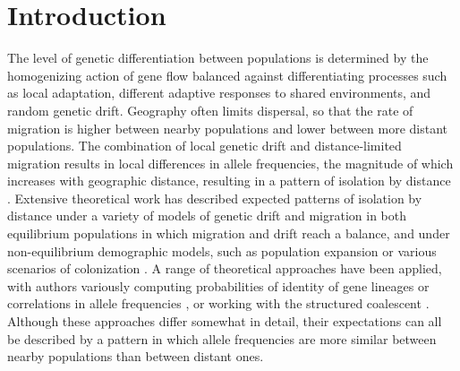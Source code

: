 \newpage


\section*{Introduction}

The level of genetic differentiation between populations is determined by the homogenizing action of gene flow balanced against differentiating processes such as local adaptation, different adaptive responses to shared environments, and random genetic drift.  Geography often limits dispersal, so that the rate of migration is higher between nearby populations and lower between more distant populations.  The combination of local genetic drift and distance-limited migration results in local differences in allele frequencies, the magnitude of which increases with geographic distance, resulting in a pattern of isolation by distance \citep{Wright1943}. Extensive theoretical work has described expected patterns of isolation by distance under a variety of models of genetic drift and migration \citep{Charlesworth2003} in both equilibrium populations in which migration and drift reach a balance, and under non-equilibrium demographic models, such as population expansion or various scenarios of colonization \citep{Slatkin1993}.  A range of theoretical approaches have been applied, with authors variously computing probabilities of identity of gene lineages \citep[e.g.][]{Malecot1975, Rousset1997} or correlations in allele frequencies \citep[e.g.][]{SlatkinMaruyama1975, WeirCockerham1984}, or working with the structured coalescent \citep[e.g.][]{Hey1991, NordborgKrone2002}.  Although these approaches differ somewhat in detail, their expectations can all be described by a pattern in which allele frequencies are more similar between nearby populations than between distant ones.

